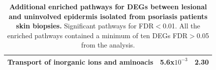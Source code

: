 \begin{table}[t]
\begin{tabular}{@{}c c c}
Transport of inorganic ions and aminoacis & 5.6x$10^{-3}$  & 2.30 \\
\bottomrule
\end{tabular}
\medskip %
\caption[Additional enriched pathways for DEGs between lesional and uninvolved epidermis isolated from psoriasis patients skin biopsies.]{\textbf{Additional enriched pathways for DEGs between lesional and uninvolved epidermis isolated from psoriasis patients skin biopsies.} Significant pathways for FDR$<$0.01. All the enriched pathways contained a minimum of ten DEGs FDR$>$0.05 from the analysis.}
\label{tab:RNAseq_PS_lesional_uninvolved_additional_pathways}
\end{table}




